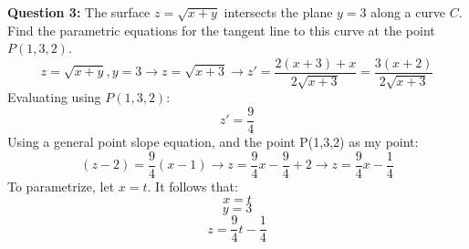 \documentclass{article}
\begin{document}
    \textbf{Question 3:} The surface $z=\sqrt{x+y}$ intersects the plane $y=3$ along a curve $C$. Find the parametric equations for the tangent line to this curve at the point $P(1,3,2)$.
\\
\[ z = \sqrt{x+y}, y=3 \rightarrow z = \sqrt{x+3} \rightarrow z' = \frac{2(x+3)+x}{2\sqrt{x+3}} = \frac{3(x+2)}{2\sqrt{x+3}} \]
Evaluating using $P(1,3,2)$:
    \[ z' = \frac{9}{4} \]
Using a general point slope equation, and the point P(1,3,2) as my point:
\[ (z-2) = \frac{9}{4}(x-1) \rightarrow z = \frac{9}{4}x -\frac{9}{4} + 2 \rightarrow z = \frac{9}{4}x - \frac{1}{4} \]
To parametrize, let $x=t$. It follows that:
\[ x = t \]
\[ y = 3 \]
\[ z = \frac{9}{4}t - \frac{1}{4} \]
\end{document}
